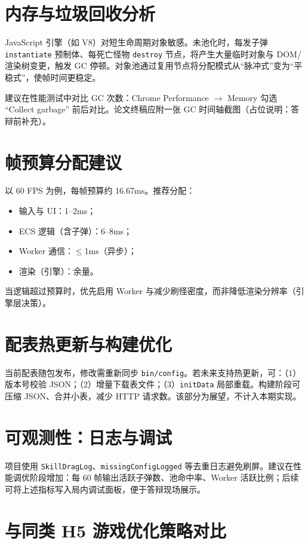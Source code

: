 ﻿
\section{内存与垃圾回收分析}

JavaScript 引擎（如 V8）对短生命周期对象敏感。未池化时，每发子弹 \texttt{instantiate} 预制体、每死亡怪物 \texttt{destroy} 节点，将产生大量临时对象与 DOM/渲染树变更，触发 GC 停顿。对象池通过复用节点将分配模式从“脉冲式”变为“平稳式”，使帧时间更稳定\cite{gregory2018game}。

建议在性能测试中对比 GC 次数：Chrome Performance $\rightarrow$ Memory 勾选 “Collect garbage” 前后对比。论文终稿应附一张 GC 时间轴截图（占位说明：答辩前补充）。

\section{帧预算分配建议}

以 60 FPS 为例，每帧预算约 16.67ms。推荐分配：
\begin{itemize}
  \item 输入与 UI：1--2ms；
  \item ECS 逻辑（含子弹）：6--8ms；
  \item Worker 通信：$\leq$1ms（异步）；
  \item 渲染（引擎）：余量。
\end{itemize}

当逻辑超过预算时，优先启用 Worker 与减少刷怪密度，而非降低渲染分辨率（引擎层决策）\cite{gregory2018game}。

\section{配表热更新与构建优化}

当前配表随包发布，修改需重新同步 \texttt{bin/config}。若未来支持热更新，可：（1）版本号校验 JSON；（2）增量下载表文件；（3）\texttt{initData} 局部重载。构建阶段可压缩 JSON、合并小表，减少 HTTP 请求数。该部分为展望，不计入本期实现。

\section{可观测性：日志与调试}

项目使用 \texttt{SkillDragLog}、\texttt{missingConfigLogged} 等去重日志避免刷屏。建议在性能调优阶段增加：每 60 帧输出活跃子弹数、池命中率、Worker 活跃比例；后续可将上述指标写入局内调试面板，便于答辩现场展示。

\section{与同类 H5 游戏优化策略对比}

